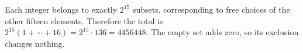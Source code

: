 Each integer belongs to exactly $2^{15}$ subsets, corresponding to free choices of the other fifteen elements. Therefore the total is $2^{15}(1+\cdots+16)=2^{15}\cdot136=\boxed{4456448}$. The empty set adds zero, so its exclusion changes nothing.
